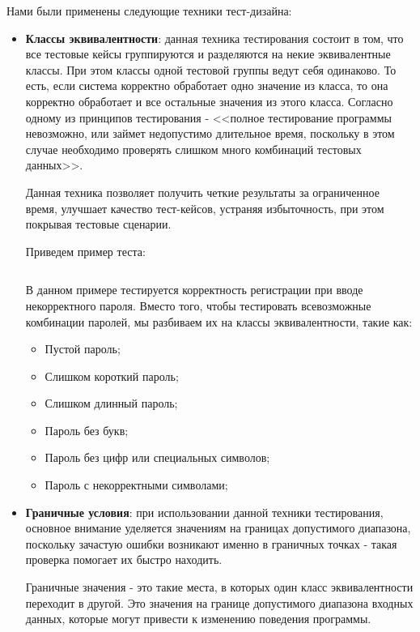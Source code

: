 \documentclass[a4paper, 14pt]{article}
\begin{document}
Нами были применены следующие техники тест-дизайна:

\begin{itemize}
    \item \textbf{Классы эквивалентности}: данная техника тестирования состоит в том, что все тестовые кейсы группируются и разделяются на некие эквивалентные классы. При этом классы одной тестовой группы ведут себя одинаково. То есть, если система корректно обработает одно значение из класса, то она корректно обработает и все остальные значения из этого класса. Согласно одному из принципов тестирования - <<полное тестирование программы невозможно, или займет недопустимо длительное время, поскольку в этом случае необходимо проверять слишком много комбинаций тестовых данных>>.

    Данная техника позволяет получить четкие результаты за ограниченное время, улучшает качество тест-кейсов, устраняя избыточность, при этом покрывая тестовые сценарии.

    Приведем пример теста:
    \normalsize
    \inputminted[frame=single]{java}{./code/2.java}
    \large

    В данном примере тестируется корректность регистрации при вводе некорректного пароля. Вместо того, чтобы тестировать всевозможные комбинации паролей, мы разбиваем их на классы эквивалентности, такие как:
    \begin{itemize}
        \item Пустой пароль;
        \item Слишком короткий пароль;
        \item Слишком длинный пароль;
        \item Пароль без букв;
        \item Пароль без цифр или специальных символов;
        \item Пароль с некорректными символами;
    \end{itemize}

    \item \textbf{Граничные условия}: при использовании данной техники тестирования, основное внимание уделяется значениям на границах допустимого диапазона, поскольку зачастую ошибки возникают именно в граничных точках - такая проверка помогает их быстро находить.

    Граничные значения - это такие места, в которых один класс эквивалентности переходит в другой. Это значения на границе допустимого диапазона входных данных, которые могут привести к изменению поведения программы.


\end{itemize}
\end{document}
